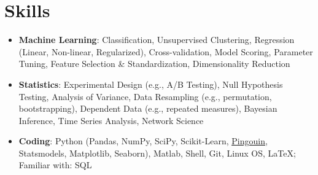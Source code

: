 \documentclass[letterpaper,10pt]{article}
\newcommand{\resumeSubHeadingListStart}{\begin{itemize}[leftmargin=*]}
\newcommand{\resumeSubHeadingListEnd}{\end{itemize}}
\begin{document}
\section{Skills}
 \resumeSubHeadingListStart
   \item{
    \textbf{Machine Learning}{: Classification, Unsupervised Clustering, Regression (Linear, Non-linear, Regularized), Cross-validation, Model Scoring, Parameter Tuning, Feature Selection \& Standardization, Dimensionality Reduction}
    }
   \item{
    \textbf{Statistics}{: Experimental Design (e.g., A/B Testing), Null Hypothesis Testing, Analysis of Variance, Data Resampling (e.g., permutation, bootstrapping), Dependent Data (e.g., repeated measures), Bayesian Inference, Time Series Analysis, Network Science}
    }
   \item{
    \textbf{Coding}{: Python (Pandas, NumPy, SciPy, Scikit-Learn, \href{https://pingouin-stats.org/}{\underline{Pingouin}}, Statsmodels, Matplotlib, Seaborn), Matlab, Shell, Git, Linux OS, LaTeX; Familiar with: SQL}
    }
 \resumeSubHeadingListEnd


\end{document}
